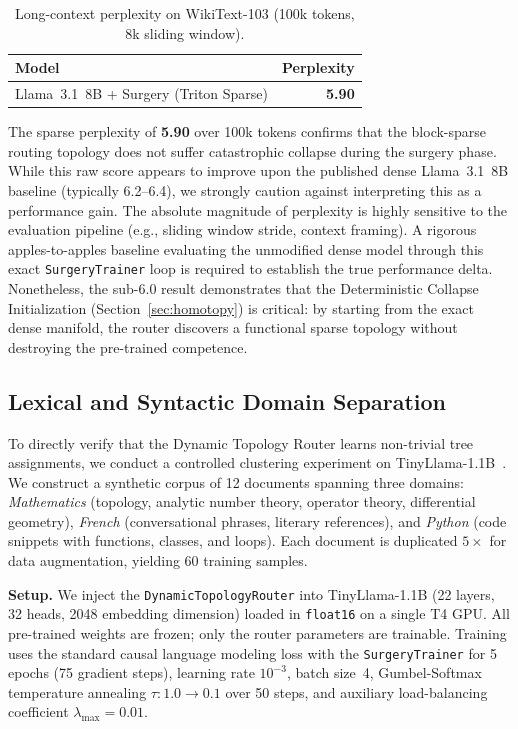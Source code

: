 \documentclass[11pt,a4paper]{article}
\begin{document}
\begin{table}[h]
\centering
\caption{Long-context perplexity on WikiText-103 (100k tokens, 8k sliding window).}
\label{tab:perplexity}
\begin{tabular}{@{}lr@{}}
\toprule
Model & Perplexity \\
\midrule
Llama~3.1~8B + Surgery (Triton Sparse) & \textbf{5.90} \\
\bottomrule
\end{tabular}
\end{table}

The sparse perplexity of \textbf{5.90} over 100k tokens confirms that the block-sparse routing topology does not suffer catastrophic collapse during the surgery phase. While this raw score appears to improve upon the published dense Llama~3.1~8B baseline (typically 6.2--6.4), we strongly caution against interpreting this as a performance gain. The absolute magnitude of perplexity is highly sensitive to the evaluation pipeline (e.g., sliding window stride, context framing). A rigorous apples-to-apples baseline evaluating the unmodified dense model through this exact \texttt{SurgeryTrainer} loop is required to establish the true performance delta. Nonetheless, the sub-6.0 result demonstrates that the Deterministic Collapse Initialization (Section~\ref{sec:homotopy}) is critical: by starting from the exact dense manifold, the router discovers a functional sparse topology without destroying the pre-trained competence.

\subsection{Lexical and Syntactic Domain Separation}
\label{sec:clustering}

To directly verify that the Dynamic Topology Router learns non-trivial tree assignments, we conduct a controlled clustering experiment on TinyLlama-1.1B~\citep{zhang2024tinyllama}. We construct a synthetic corpus of 12 documents spanning three domains: \emph{Mathematics} (topology, analytic number theory, operator theory, differential geometry), \emph{French} (conversational phrases, literary references), and \emph{Python} (code snippets with functions, classes, and loops). Each document is duplicated $5\times$ for data augmentation, yielding 60 training samples.

\textbf{Setup.} We inject the \texttt{DynamicTopologyRouter} into TinyLlama-1.1B (22 layers, 32 heads, 2048 embedding dimension) loaded in \texttt{float16} on a single T4 GPU. All pre-trained weights are frozen; only the router parameters are trainable. Training uses the standard causal language modeling loss with the \texttt{SurgeryTrainer} for 5 epochs (75 gradient steps), learning rate $10^{-3}$, batch size~4, Gumbel-Softmax temperature annealing $\tau: 1.0 \to 0.1$ over 50 steps, and auxiliary load-balancing coefficient $\lambda_{\max} = 0.01$.
\end{document}
